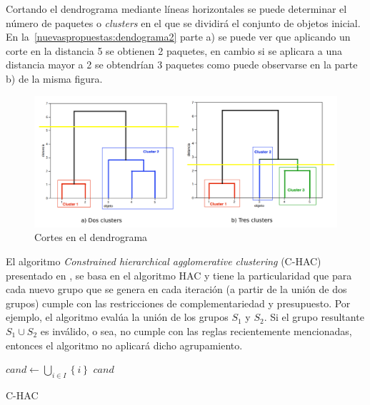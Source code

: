 Cortando el dendrograma mediante líneas horizontales se puede determinar el número de paquetes o \emph{clusters} en el que se dividirá el conjunto de objetos inicial. En la~\autoref{nuevaspropuestas:dendograma2} parte a) se puede ver que aplicando un corte en la distancia 5 se obtienen 2 paquetes, en cambio si se aplicara a una distancia mayor a 2 se obtendrían 3 paquetes como puede observarse en la parte b) de la misma figura.

\begin{figure}[H]
  \centering
    \includegraphics[width=1\textwidth]{img/dendograma02.png}
  \caption{Cortes en el dendrograma}
  \label{nuevaspropuestas:dendograma2}
\end{figure}

El algoritmo \textit{Constrained hierarchical agglomerative clustering} (C-HAC) presentado en \cite{journals/tkde/Amer-YahiaBCFMZ14}, se basa en el algoritmo HAC y tiene la particularidad que para cada nuevo grupo que se genera en cada iteración (a partir de la unión de dos grupos) cumple con las restricciones de complementariedad y presupuesto. Por ejemplo, el algoritmo evalúa la unión de los grupos $S_1$ y $S_2$. Si el grupo resultante $S_1 \cup S_2$ es inválido, o sea, no cumple con las reglas recientemente mencionadas, entonces el algoritmo no aplicará dicho agrupamiento.

\begin{center}
	\begin{algorithm}[H]
	\DontPrintSemicolon
	\SetAlgoLined
		$cand \leftarrow \bigcup_{i \in I}\left\{i\right\}$\; \label{alg:C-HAC:init}
		\Return $cand$\;
	\caption{C-HAC}\label{alg:C-HAC}
	\end{algorithm}
\end{center}


